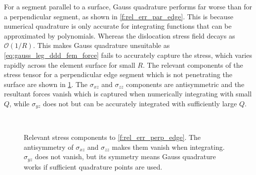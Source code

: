 \documentclass[11pt]{iopart}
\begin{document}
For a segment parallel to a surface, Gauss quadrature performs far worse than for a perpendicular segment, as shown in \cref{f:rel_err_par_edge}. This is because numerical quadrature is only accurate for integrating functions that can be approximated by polynomials. Whereas the dislocation stress field \cite{Cai2006} decays as $\mathcal{O}(1/R)$. This makes Gauss quadrature unsuitable as \cref{eq:gauss_leg_ddd_fem_force} fails to accurately capture the stress, which varies rapidly across the element surface for small $R$. The relevant components of the stress tensor for a perpendicular edge segment which is not penetrating the surface are shown in \cref{f:sigma_perp_edge}. The $\sigma_{xz}$ and $\sigma_{zz}$ components are antisymmetric and the resultant forces vanish which is captured when numerically integrating with small $Q$, while $\sigma_{yz}$ does not but can be accurately integrated with sufficiently large $Q$.

\begin{figure}[t]
    \centering
    ~
    ~
    \caption{Relevant stress components to \cref{f:rel_err_perp_edge}. The antisymmetry of $\sigma_{xz}$ and $\sigma_{zz}$ makes them vanish when integrating. $\sigma_{yz}$ does not vanish, but its symmetry means Gauss quadrature works if sufficient quadrature points are used.}
    \label{f:sigma_perp_edge}
\end{figure}
\end{document}
